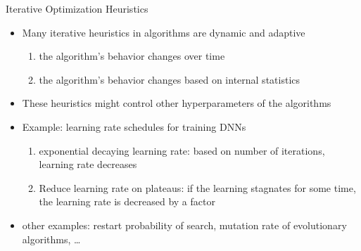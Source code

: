 \begin{frame}[c]{Iterative Optimization Heuristics}
	
	\begin{itemize}
		\item Many iterative heuristics in algorithms are dynamic and adaptive
		\begin{enumerate}
			\item the algorithm's behavior changes over time
			\item the algorithm's behavior changes based on internal statistics
		\end{enumerate}
		\medskip
		\pause
		\item These heuristics might control other hyperparameters of the algorithms
		\pause
		\smallskip
		\item Example: learning rate schedules for training DNNs
		\begin{enumerate}
			\item exponential decaying learning rate: based on number of iterations, learning rate decreases
			\pause
			\item Reduce learning rate on plateaus: if the learning stagnates for some time,\\ the learning rate is decreased by a factor
		\end{enumerate}
		\pause
		\smallskip
		\item other examples: restart probability of search, mutation rate of evolutionary algorithms, \ldots  
		
	\end{itemize}
	
\end{frame}
